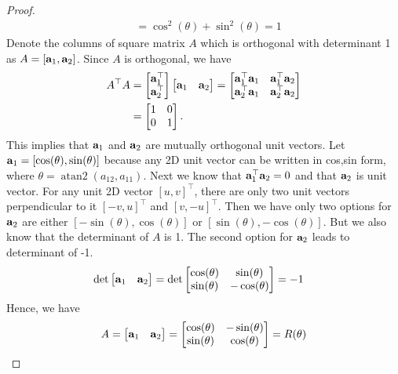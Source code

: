 \documentclass[twocolumn]{article}
\DeclareMathOperator{\atantwo}{atan2}
\begin{document}
\begin{proof}
\begin{align}
              &= \cos^2(\theta)+  \sin^2(\theta)  = 1
      \end{align}
  Denote the columns of square matrix $A$ which  is orthogonal with determinant
  1 as $A = [\mathbf{a}_1, \mathbf{a}_2]$. Since $A$ is orthogonal,  we have
  \begin{align}
    A^\top A
    &= \begin{bmatrix}
      \mathbf{a}_1^\top  \\   \mathbf{a}_2^\top
    \end{bmatrix}
    \begin{bmatrix}
      \mathbf{a}_1  &   \mathbf{a}_2
    \end{bmatrix}  = \begin{bmatrix} \mathbf{a}_1^\top \mathbf{a}_1  & \mathbf{a}_1^\top \mathbf{a}_2
      \\
      \mathbf{a}_2^\top \mathbf{a}_1 & \mathbf{a}_2^\top \mathbf{a}_2\end{bmatrix}
      \notag\\
    &= \begin{bmatrix} 1  &  0   \\  0  &  1 \end{bmatrix}.
  \end{align}
  This   implies that $\mathbf{a}_1$  and  $\mathbf{a}_2$ are mutually orthogonal unit
  vectors. Let $\mathbf{a}_1  = [\cos(\theta), \sin(\theta)]$ because any 2D unit
  vector can  be written in cos,sin form, where $\theta = \atantwo(a_{12}, a_{11})$.
  Next we know  that  $\mathbf{a}_1^\top\mathbf{a}_2 =  0$ and that $\mathbf{a}_2$ is unit  vector.
  For any  unit 2D vector   $[u, v]^\top$, there are only two unit vectors
  perpendicular to it $[-v, u]^\top$ and $[v, -u]^\top$.
  Then we have only two
  options for $\mathbf{a}_2$  are  either $[-\sin(\theta), \cos(\theta)]$ or
  $[\sin(\theta), -\cos(\theta)]$.  But we also  know that the determinant of
  $A$ is  1. The second option   for $\mathbf{a}_2$ leads to determinant of -1.
  \begin{align}
    \det\begin{bmatrix}
      \mathbf{a}_1  &  \mathbf{a}_2
      \end{bmatrix}
    &=  
      \det\begin{bmatrix}
        \cos(\theta)  &  \sin(\theta)\\
        \sin(\theta) &  -\cos(\theta)
      \end{bmatrix} = -1
    \end{align}
    Hence, we have
    \[
      A = \begin{bmatrix}
        \mathbf{a}_1  &  \mathbf{a}_2
      \end{bmatrix}
      =  
      \begin{bmatrix}
        \cos(\theta)  &  -\sin(\theta)\\
        \sin(\theta) &  \cos(\theta)
      \end{bmatrix} = R(\theta) \]

\end{proof}
\end{document}
